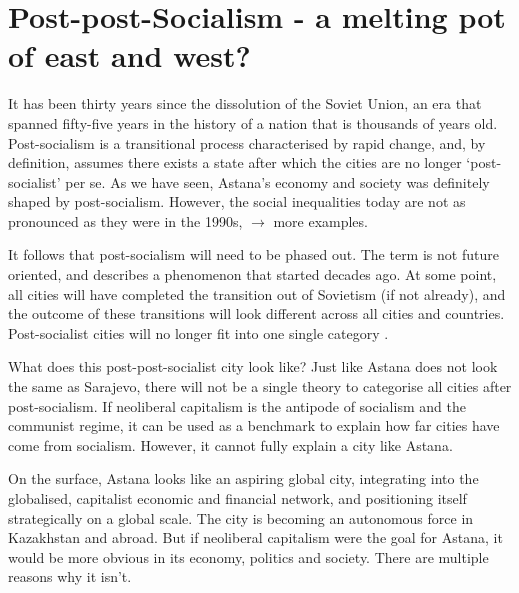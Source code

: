 \documentclass{article}
\begin{document}
\section{Post-post-Socialism - a melting pot of east and west?}



It has been thirty years since the dissolution of the Soviet Union, an era that spanned fifty-five years in the history of a nation that is thousands of years old. Post-socialism is a transitional process characterised by rapid change, and, by definition, assumes there exists a state after which the cities are no longer `post-socialist' per se. 
As we have seen, Astana's economy and society was definitely shaped by post-socialism. However, the social inequalities today are not as pronounced as they were in the 1990s, $\rightarrow$ more examples.

It follows that post-socialism will need to be phased out. The term is not future oriented, and describes a phenomenon that started decades ago. At some point, all cities will have completed the transition out of Sovietism (if not already), and the outcome of these transitions will look different across all cities and countries. Post-socialist cities will no longer fit into one single category \parencite{hirt2016conceptual}.

What does this post-post-socialist city look like? Just like Astana does not look the same as Sarajevo, there will not be a single theory to categorise all cities after post-socialism. If neoliberal capitalism is the antipode of socialism and the communist regime, it can be used as a benchmark to explain how far cities have come from socialism. However, it cannot fully explain a city like Astana.

On the surface, Astana looks like an aspiring global city, integrating into the globalised, capitalist economic and financial network, and positioning itself strategically on a global scale. The city is becoming an autonomous force in Kazakhstan and abroad.
But if neoliberal capitalism were the goal for Astana, it would be more obvious in its economy, politics and society. There are multiple reasons why it isn't.
\end{document}
